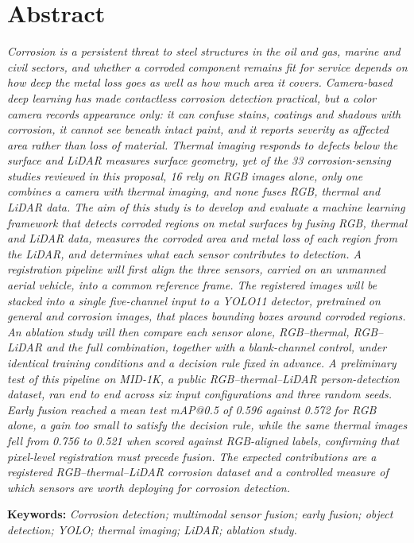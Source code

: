 \chapter*{Abstract}

\emph{Corrosion is a persistent threat to steel structures in the oil and
gas, marine and civil sectors, and whether a corroded component remains fit
for service depends on how deep the metal loss goes as well as how much area
it covers. Camera-based deep learning has made contactless corrosion
detection practical, but a color camera records appearance only: it can
confuse stains, coatings and shadows with corrosion, it cannot see beneath
intact paint, and it reports severity as affected area rather than loss of
material. Thermal imaging responds to defects below the surface and LiDAR
measures surface geometry, yet of the 33 corrosion-sensing studies reviewed in
this proposal, 16 rely on RGB images alone, only one combines a camera with
thermal imaging, and none fuses RGB, thermal and LiDAR data. The aim of this
study is to develop and evaluate a machine learning framework that detects
corroded regions on metal surfaces by fusing RGB, thermal and LiDAR data,
measures the corroded area and metal loss of each region from the LiDAR, and
determines what each sensor contributes to detection. A registration pipeline
will first align the three sensors, carried on an unmanned aerial vehicle,
into a common reference frame. The registered images will be stacked into a
single five-channel input to a YOLO11 detector, pretrained on general and
corrosion images, that places bounding boxes around corroded regions. An
ablation study will then compare each sensor alone, RGB--thermal, RGB--LiDAR
and the full combination, together with a blank-channel control, under
identical training conditions and a decision rule fixed in advance. A
preliminary test of this pipeline on MID-1K, a public RGB--thermal--LiDAR
person-detection dataset, ran end to end across six input configurations and
three random seeds. Early fusion reached a mean test mAP@0.5 of 0.596 against
0.572 for RGB alone, a gain too small to satisfy the decision rule, while the
same thermal images fell from 0.756 to 0.521 when scored against
RGB-aligned labels, confirming that pixel-level registration must precede
fusion. The expected contributions are a registered RGB--thermal--LiDAR
corrosion dataset and a controlled measure of which sensors are worth
deploying for corrosion detection.}

\vspace{0.8\baselineskip}

\noindent\textbf{Keywords:} \emph{Corrosion detection; multimodal sensor
fusion; early fusion; object detection; YOLO; thermal imaging; LiDAR; ablation
study.}
